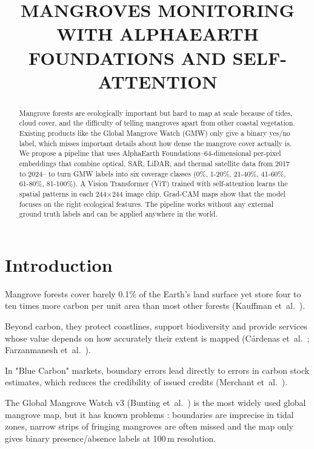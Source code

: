 \documentclass[conference,a4paper]{IEEEtran}
\begin{document}
\title{\uppercase{Mangroves Monitoring with AlphaEarth Foundations and Self-Attention}}
\maketitle

\begin{abstract}
Mangrove forests are ecologically important but hard to map at scale because of tides, cloud cover, and the difficulty of telling mangroves apart from other coastal vegetation. 
Existing products like the Global Mangrove Watch (GMW) 
only give a binary yes/no label, 
which misses important details about how dense the mangrove cover actually is. 
We propose a pipeline that uses AlphaEarth Foundations--64-dimensional per-pixel embeddings that combine optical, SAR, LiDAR, and thermal satellite data from 2017 to 2024--
to turn GMW labels into six coverage classes (0\%, 1-20\%, 21-40\%, 41-60\%, 61-80\%, 81-100\%). 
A Vision Transformer (ViT) trained with self-attention learns the spatial patterns in each 244$\times$244 image chip. 
Grad-CAM maps show that the model focuses on the right ecological features. 
The pipeline works without any external ground truth labels and can be applied anywhere in the world.

\end{abstract}

\section{Introduction}

Mangrove forests cover barely 0.1\% of the Earth's land surface yet store four to ten times more carbon per unit area than most other forests (Kauffman et~al.~\cite{article23}). 

Beyond carbon, they protect coastlines, support biodiversity 
and provide services whose value depends on how accurately their extent is mapped (C\'ardenas et~al.~\cite{article5}; Farzanmanesh et~al.~\cite{article8}). 

In "Blue Carbon" markets, boundary errors lead directly to errors in carbon stock estimates, 
which reduces the credibility of issued credits (Merchant et~al.~\cite{article34}).

The Global Mangrove Watch v3 (Bunting et~al.~\cite{article14}) is the most widely used global mangrove map, 
but it has known problems : boundaries are imprecise in tidal zones, 
narrow strips of fringing mangroves are often missed 
and the map only gives binary presence/absence labels at 100\,m resolution. 
\end{document}
